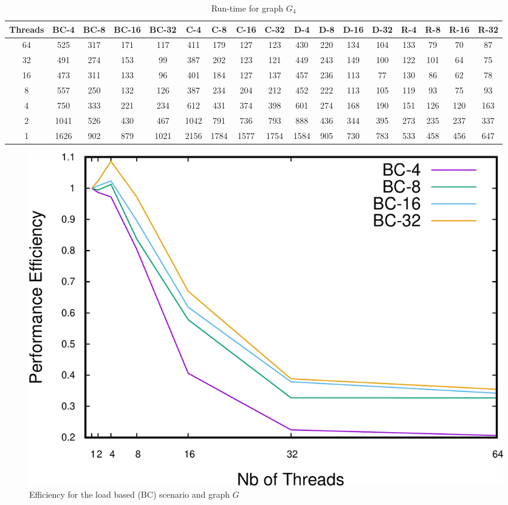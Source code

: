\begin{table}[t]
\begin{minipage}[b]{\textwidth}
\caption{Run-time for graph $G_4$}
\label{tab:graph4}
{\small
\begin{tabular}{||c||c|c|c|c||c|c|c|c||c|c|c|c||c|c|c|c|}
\hline
\textbf{Threads}	&\cellcolor{black!10}BC-4&	\cellcolor{black!10}BC-8	&\cellcolor{black!10}BC-16	&\cellcolor{black!10}BC-32&	\cellcolor{black!10}C-4	&\cellcolor{black!10}C-8&	\cellcolor{black!10}C-16&	\cellcolor{black!10}C-32&	\cellcolor{black!10}D-4&	\cellcolor{black!10}D-8	&\cellcolor{black!10}D-16&\cellcolor{black!10}	D-32&	\cellcolor{black!10}R-4	&\cellcolor{black!10}R-8&	\cellcolor{black!10}R-16&	\cellcolor{black!10}R-32 \\ \hline \hline
64 &		525&	317	&171&	117	&411	&179&	127	&123	&430	&220	&134	&104&	133&	79&	70	&87	 \\ \hline		
32	&	491&	274	&153	&99	&387	&202	&123	&121 &449	&243&	149&	100	&122	&101&	64&	75\\ \hline
16	&	473	&311	&133	&96	&401	&184	&127	&137 &457	&236	&113	&77	&130	&86	&62	&78 \\ \hline
8	&	557&	250	&132	&126	&387	&234	&204	&212 &452	&222	&113	&105	&119&	93	&75	&93 \\ \hline
4		&750&	333	&221	&234	&612	&431	&374	&398 &601	&274 &168	&190	&151	&126&	120	&163 \\ \hline
2		&1041 &526 &430 &467	&1042	&791	&736	&793 &888	&436	&344	&395	&273	&235	&237	&337 \\ \hline
1		&1626&902&879 &1021 &2156 &1784 &1577 &1754 &1584 &905 &730 &783& 533 &458 &456 &647 \\ \hline
\end{tabular}
}
\end{minipage}
\end{table}

\begin{figure}
\centering
\includegraphics[scale=0.35]{bench/bench-efficiency/efficiency-bc-1-crop.pdf}
\caption{Efficiency for the load based (BC) scenario and graph $G$}
\label{fig:effbc1}
\end{figure}

